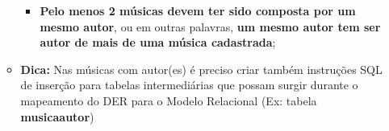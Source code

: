 \documentclass[12pt]{exam}
\begin{document}
\begin{questions}
\begin{itemize}
\begin{itemize}
\begin{itemize}
                \item \textbf{Pelo menos 2 músicas devem ter sido composta por um mesmo autor}, ou em outras palavras, \textbf{um mesmo autor tem ser autor de mais de uma música cadastrada};
            \end{itemize}
            \item \textbf{Dica:} Nas músicas com autor(es) é preciso criar também instruções SQL de inserção para tabelas intermediárias que possam surgir durante o mapeamento do DER para o Modelo Relacional (Ex: tabela \textbf{musica\underline{\hspace{0.3cm}}autor})
        \end{itemize}
\end{itemize}











\end{questions}
\end{document}
